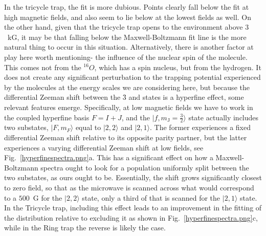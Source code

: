 \documentclass[defaultstyle,11pt]{thesis}
\begin{document}
In the tricycle trap, the fit is more dubious. 
Points clearly fall below the fit at high magnetic fields, and also seem to lie below at the lowest fields as well.
On the other hand, given that the tricycle trap opens to the environment above $3$~kG, it may be that falling below the Maxwell-Boltzmann fit line is the more natural thing to occur in this situation.
Alternatively, there is another factor at play here worth mentioning- the influence of the nuclear spin of the molecule. 
This comes not from the $^16O$, which has a spin nucleus, but from the hydrogen.
It does not create any significant perturbation to the trapping potential experienced by the molecules at the energy scales we are considering here, but because the differential Zeeman shift between the \f3 and  states is a hyperfine effect, some relevant features emerge.
Specifically, at low magnetic fields we have to work in the coupled hyperfine basis $F=I+J$, and the $|f,m_\text{J}=\frac{3}{2}\rangle$ state actually includes two substates, $|F,m_F\rangle$ equal to $|2,2\rangle$ and $|2,1\rangle$.
The former experiences a fixed differential Zeeman shift relative to its opposite parity partner, but the latter experiences a varying differential Zeeman shift at low fields, see Fig.~\ref{hyperfinespectra.png}a.
This has a significant effect on how a Maxwell-Boltzmann spectra ought to look for a population uniformly split between the two substates, as ours ought to be.
Essentially, the shift grows significantly closest to zero field, so that as the microwave is  scanned across what would correspond to a $500$~G for the $|2,2\rangle$ state, only a third of that is scanned for the $|2,1\rangle$ state.
In the Tricycle trap, including this effect leads to an improvement in the fitting of the distribution relative to excluding it as shown in Fig.~\ref{hyperfinespectra.png}c, while in the Ring trap the reverse is likely the case.

\end{document}
